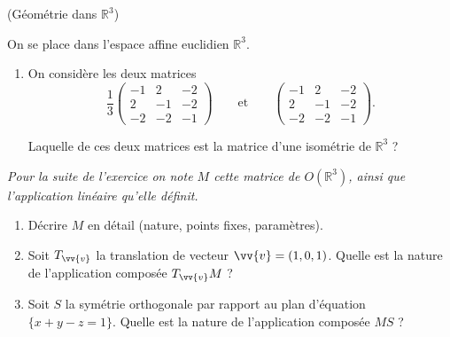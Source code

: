 \documentclass[a4paper,12pt,reqno]{amsart}
\begin{document}
\begin{exo} (Géométrie dans $\mathbb{R}^{3}$)

  On se place dans l'espace affine euclidien $\mathbb{R}^{3}$.

  \begin{enumerate}

    \item On considère les deux matrices
    \[
      \renewcommand{\arraystretch}{.77}
      \frac{1}{3}
      \begin{pmatrix}
        −1 & 2 & −2 \\
         2 &−1 & −2 \\
        −2 &−2 & −1
      \end{pmatrix}
      \qquad\text{et}\qquad
      \begin{pmatrix}
        −1 & 2 & −2 \\
         2 &−1 & −2 \\
        −2 &−2 & −1
      \end{pmatrix}
    .\]

    Laquelle de ces deux matrices est la matrice d'une isométrie de $\mathbb{R}^{3}$ ?
  \end{enumerate}

    \emph{Pour la suite de l'exercice on note $M$ cette matrice de $O(\mathbb{R}^{3})$, ainsi que l'application linéaire qu'elle définit.}

  \begin{enumerate}[resume]

    \item Décrire $M$ en détail (nature, points fixes, paramètres).

    \item Soit $T_{\vv{v}}$ la translation de vecteur $\vv{v} = (1,0,1)$. Quelle est la nature de l'application composée $T_{\vv{v}}M$ ?

    \item Soit $S$ la symétrie orthogonale par rapport au plan d'équation $\{x+y-z=1\}$. Quelle est la nature de l'application composée $MS$ ?
  \end{enumerate}
\end{exo}
\end{document}
